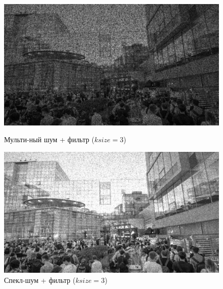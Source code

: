 \documentclass[a4paper]{article}
\begin{document}
\begin{figure}[H]
    \begin{minipage}{0.49\textwidth}
        \centering \includegraphics[width=\textwidth]{images/3_nonlinear_filters/multiplicative - median (ksize=3).jpg}
        \caption{Мульти-ный шум + фильтр ($ksize = 3$)}
    \end{minipage}\hfill
    \begin{minipage}{0.49\textwidth}
        \centering \includegraphics[width=\textwidth]{images/3_nonlinear_filters/speckle - median (ksize=3).jpg}
        \caption{Спекл-шум + фильтр ($ksize = 3$)}
    \end{minipage}
\end{figure}
\end{document}
